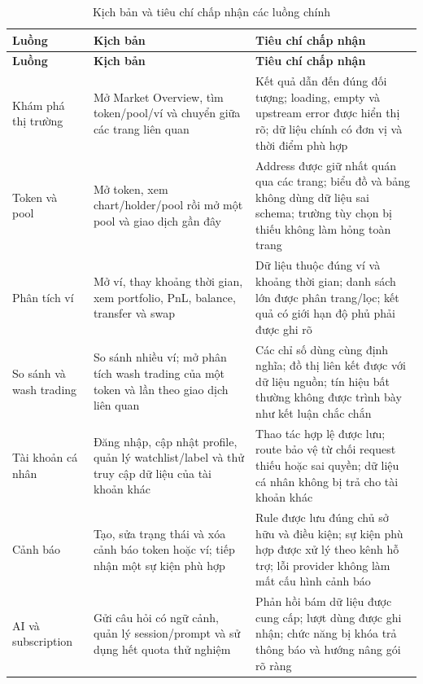 \small
\begin{longtable}{|p{3.1cm}|p{5.4cm}|p{6.0cm}|}
\caption{Kịch bản và tiêu chí chấp nhận các luồng chính}\label{tab:acceptance_criteria} \\
\hline
\textbf{Luồng} & \textbf{Kịch bản} & \textbf{Tiêu chí chấp nhận} \\
\hline
\endfirsthead
\hline
\textbf{Luồng} & \textbf{Kịch bản} & \textbf{Tiêu chí chấp nhận} \\
\hline
\endhead

Khám phá thị trường & Mở Market Overview, tìm token/pool/ví và chuyển giữa các trang liên quan & Kết quả dẫn đến đúng đối tượng; loading, empty và upstream error được hiển thị rõ; dữ liệu chính có đơn vị và thời điểm phù hợp \\
\hline
Token và pool & Mở token, xem chart/holder/pool rồi mở một pool và giao dịch gần đây & Address được giữ nhất quán qua các trang; biểu đồ và bảng không dùng dữ liệu sai schema; trường tùy chọn bị thiếu không làm hỏng toàn trang \\
\hline
Phân tích ví & Mở ví, thay khoảng thời gian, xem portfolio, PnL, balance, transfer và swap & Dữ liệu thuộc đúng ví và khoảng thời gian; danh sách lớn được phân trang/lọc; kết quả có giới hạn độ phủ phải được ghi rõ \\
\hline
So sánh và wash trading & So sánh nhiều ví; mở phân tích wash trading của một token và lần theo giao dịch liên quan & Các chỉ số dùng cùng định nghĩa; đồ thị liên kết được với dữ liệu nguồn; tín hiệu bất thường không được trình bày như kết luận chắc chắn \\
\hline
Tài khoản cá nhân & Đăng nhập, cập nhật profile, quản lý watchlist/label và thử truy cập dữ liệu của tài khoản khác & Thao tác hợp lệ được lưu; route bảo vệ từ chối request thiếu hoặc sai quyền; dữ liệu cá nhân không bị trả cho tài khoản khác \\
\hline
Cảnh báo & Tạo, sửa trạng thái và xóa cảnh báo token hoặc ví; tiếp nhận một sự kiện phù hợp & Rule được lưu đúng chủ sở hữu và điều kiện; sự kiện phù hợp được xử lý theo kênh hỗ trợ; lỗi provider không làm mất cấu hình cảnh báo \\
\hline
AI và subscription & Gửi câu hỏi có ngữ cảnh, quản lý session/prompt và sử dụng hết quota thử nghiệm & Phản hồi bám dữ liệu được cung cấp; lượt dùng được ghi nhận; chức năng bị khóa trả thông báo và hướng nâng gói rõ ràng \\
\hline
\end{longtable}
\normalsize

